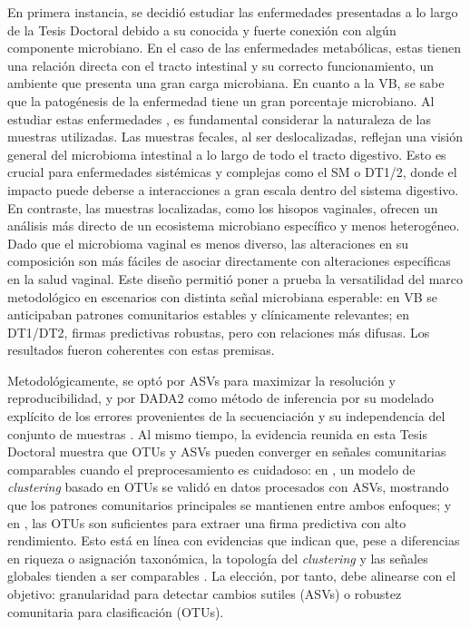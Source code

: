 En primera instancia, se decidió estudiar las enfermedades presentadas a lo largo de la Tesis Doctoral debido a su conocida y fuerte conexión con algún componente microbiano. En el caso de las enfermedades metabólicas, estas tienen una relación directa con el tracto intestinal y su correcto funcionamiento, un ambiente que presenta una gran carga microbiana. En cuanto a la VB, se sabe que la patogénesis de la enfermedad tiene un gran porcentaje microbiano. Al estudiar estas enfermedades \cite{paper1, paper2, paper3}, es fundamental considerar la naturaleza de las muestras utilizadas. Las muestras fecales, al ser deslocalizadas, reflejan una visión general del microbioma intestinal a lo largo de todo el tracto digestivo. Esto es crucial para enfermedades sistémicas y complejas como el SM o DT1/2, donde el impacto puede deberse a interacciones a gran escala dentro del sistema digestivo. En contraste, las muestras localizadas, como los hisopos vaginales, ofrecen un análisis más directo de un ecosistema microbiano específico y menos heterogéneo. Dado que el microbioma vaginal es menos diverso, las alteraciones en su composición son más fáciles de asociar directamente con alteraciones específicas en la salud vaginal. Este diseño permitió poner a prueba la versatilidad del marco metodológico en escenarios con distinta señal microbiana esperable: en VB se anticipaban patrones comunitarios estables y clínicamente relevantes; en DT1/DT2, firmas predictivas robustas, pero con relaciones más difusas. Los resultados fueron coherentes con estas premisas.


Metodológicamente, se optó por ASVs para maximizar la resolución y reproducibilidad, y por DADA2 como método de inferencia por su modelado explícito de los errores provenientes de la secuenciación y su independencia del conjunto de muestras \cite{callahan2017exact, nearing2018denoising, caruso2019performance, prodan2020comparing}. Al mismo tiempo, la evidencia reunida en esta Tesis Doctoral muestra que OTUs y ASVs pueden converger en señales comunitarias comparables cuando el preprocesamiento es cuidadoso: en \cite{paper3}, un modelo de \textit{clustering} basado en OTUs se validó en datos procesados con ASVs, mostrando que los patrones comunitarios principales se mantienen entre ambos enfoques; y en \cite{paper2}, las OTUs son suficientes para extraer una firma predictiva con alto rendimiento. Esto está en línea con evidencias que indican que, pese a diferencias en riqueza o asignación taxonómica, la topología del \textit{clustering} y las señales globales tienden a ser comparables \cite{chiarello2022ranking}. La elección, por tanto, debe alinearse con el objetivo: granularidad para detectar cambios sutiles (ASVs) o robustez comunitaria para clasificación (OTUs).


